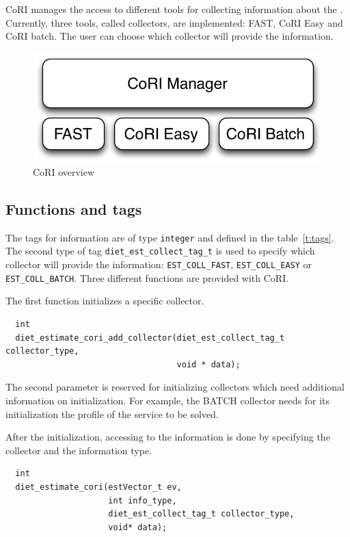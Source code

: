 CoRI manages the access to different tools for collecting information about the
\sed. Currently, three tools, called collectors, are implemented: FAST, CoRI
Easy and CoRI batch. The user can choose which collector will provide the
information.

\begin{figure}[h]
  \begin{center}
    \includegraphics[scale=0.5]{fig/overviewCori}
    \caption{CoRI overview}
    \label{fig:cori-overview}
  \end{center}
\end{figure}

\subsection{Functions and tags}
The tags for information are of type \texttt{integer} and defined in the
table~\ref{t:tags}. The second type of tag \texttt{diet\_est\_collect\_tag\_t}
is used to specify which collector will provide the information:
\texttt{EST\_COLL\_FAST}, \texttt{EST\_COLL\_EASY} or
\texttt{EST\_COLL\_BATCH}. Three different functions are provided with CoRI.

The first function initializes a specific collector.

\footnotesize
\begin{verbatim}
  int
  diet_estimate_cori_add_collector(diet_est_collect_tag_t collector_type,
                                   void * data);
\end{verbatim}
\normalsize The second parameter is reserved for initializing collectors which
need additional information on initialization. For example, the BATCH collector
needs for its initialization the profile of the service to be solved.

After the initialization, accessing to the information is done by specifying
the collector and the information type.
\footnotesize
\begin{verbatim}
  int
  diet_estimate_cori(estVector_t ev,
                     int info_type,
                     diet_est_collect_tag_t collector_type,
                     void* data);
\end{verbatim}
\normalsize

